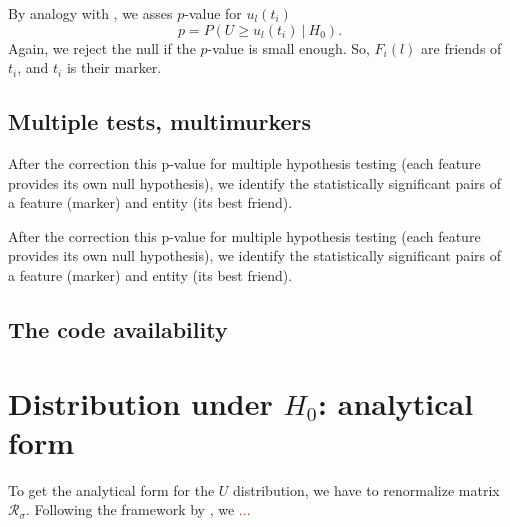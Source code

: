 \documentclass{llncs}
\begin{document}

By analogy with , we asses $p$-value for $u_{l}(t_i)$
\[
p = P\left(U \ge u_l(t_i)~|~H_0\right). 
\]
Again, we reject the null if the $p$-value is small enough. So, $F_{i}(l)$ are friends of $t_i$, and $t_i$ is their marker.


\subsection{Multiple tests, multimurkers}After the correction this p-value for multiple hypothesis testing (each feature provides its own null hypothesis), we identify the statistically significant pairs of a feature (marker) and entity (its best friend).

After the correction this p-value for multiple hypothesis testing (each feature provides its own null hypothesis), we identify the statistically significant pairs of a feature (marker) and entity (its best friend).


\subsection{The code availability}











\section{Distribution under $H_0$: analytical form}
\label{sec:theory}
To get the analytical form for the $U$ distribution, we have to renormalize 
matrix $\mathcal{R}_{\sigma}$. Following the framework by \cite{Solomon2018OptimalTO}, we \textcolor{red}{...}
\end{document}

